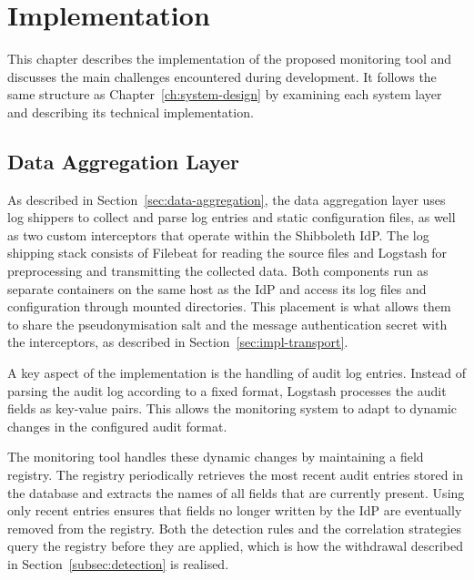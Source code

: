 \documentclass[../main.tex]{subfiles}
\begin{document}
\chapter{Implementation}\label{ch:implementation}

This chapter describes the implementation of the proposed monitoring tool and 
discusses the main challenges encountered during development. 
It follows the same structure as Chapter~\ref{ch:system-design} by examining 
each system layer and describing its technical implementation. 

\section{Data Aggregation Layer}\label{sec:impl-aggregation}

As described in Section~\ref{sec:data-aggregation}, the data aggregation layer 
uses log shippers to collect and parse log entries and static configuration 
files, as well as two custom interceptors that operate within the Shibboleth IdP. 
The log shipping stack consists of Filebeat for reading the source files and 
Logstash for preprocessing and transmitting the collected data. 
Both components run as separate containers on the same host as the IdP and access its log files 
and configuration through mounted directories. 
This placement is what allows them to share the pseudonymisation salt and the message 
authentication secret with the interceptors, as described in Section~\ref{sec:impl-transport}.

A key aspect of the implementation is the handling of audit log entries. 
Instead of parsing the audit log according to a fixed format, Logstash processes 
the audit fields as key-value pairs. 
This allows the monitoring system to adapt to dynamic changes in the configured 
audit format. 

The monitoring tool handles these dynamic changes by maintaining a field registry. 
The registry periodically retrieves the most recent audit entries stored in the 
database and extracts the names of all fields that are currently present. 
Using only recent entries ensures that fields no longer written by the IdP are 
eventually removed from the registry. 
Both the detection rules and the correlation strategies query the registry before 
they are applied, which is how the withdrawal described in 
Section~\ref{subsec:detection} is realised. 
\end{document}
